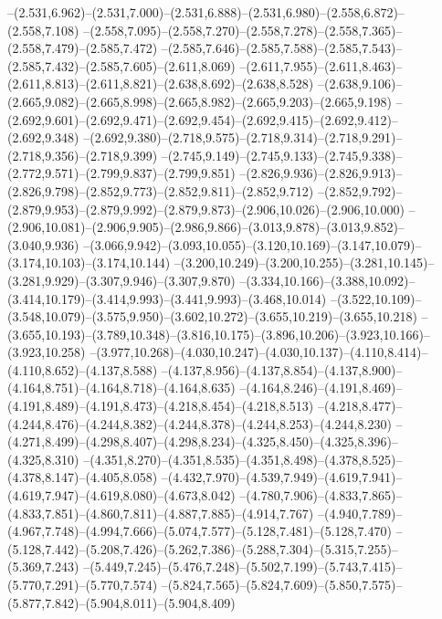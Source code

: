   --(2.531,6.962)--(2.531,7.000)--(2.531,6.888)--(2.531,6.980)--(2.558,6.872)--(2.558,7.108)%
  --(2.558,7.095)--(2.558,7.270)--(2.558,7.278)--(2.558,7.365)--(2.558,7.479)--(2.585,7.472)%
  --(2.585,7.646)--(2.585,7.588)--(2.585,7.543)--(2.585,7.432)--(2.585,7.605)--(2.611,8.069)%
  --(2.611,7.955)--(2.611,8.463)--(2.611,8.813)--(2.611,8.821)--(2.638,8.692)--(2.638,8.528)%
  --(2.638,9.106)--(2.665,9.082)--(2.665,8.998)--(2.665,8.982)--(2.665,9.203)--(2.665,9.198)%
  --(2.692,9.601)--(2.692,9.471)--(2.692,9.454)--(2.692,9.415)--(2.692,9.412)--(2.692,9.348)%
  --(2.692,9.380)--(2.718,9.575)--(2.718,9.314)--(2.718,9.291)--(2.718,9.356)--(2.718,9.399)%
  --(2.745,9.149)--(2.745,9.133)--(2.745,9.338)--(2.772,9.571)--(2.799,9.837)--(2.799,9.851)%
  --(2.826,9.936)--(2.826,9.913)--(2.826,9.798)--(2.852,9.773)--(2.852,9.811)--(2.852,9.712)%
  --(2.852,9.792)--(2.879,9.953)--(2.879,9.992)--(2.879,9.873)--(2.906,10.026)--(2.906,10.000)%
  --(2.906,10.081)--(2.906,9.905)--(2.986,9.866)--(3.013,9.878)--(3.013,9.852)--(3.040,9.936)%
  --(3.066,9.942)--(3.093,10.055)--(3.120,10.169)--(3.147,10.079)--(3.174,10.103)--(3.174,10.144)%
  --(3.200,10.249)--(3.200,10.255)--(3.281,10.145)--(3.281,9.929)--(3.307,9.946)--(3.307,9.870)%
  --(3.334,10.166)--(3.388,10.092)--(3.414,10.179)--(3.414,9.993)--(3.441,9.993)--(3.468,10.014)%
  --(3.522,10.109)--(3.548,10.079)--(3.575,9.950)--(3.602,10.272)--(3.655,10.219)--(3.655,10.218)%
  --(3.655,10.193)--(3.789,10.348)--(3.816,10.175)--(3.896,10.206)--(3.923,10.166)--(3.923,10.258)%
  --(3.977,10.268)--(4.030,10.247)--(4.030,10.137)--(4.110,8.414)--(4.110,8.652)--(4.137,8.588)%
  --(4.137,8.956)--(4.137,8.854)--(4.137,8.900)--(4.164,8.751)--(4.164,8.718)--(4.164,8.635)%
  --(4.164,8.246)--(4.191,8.469)--(4.191,8.489)--(4.191,8.473)--(4.218,8.454)--(4.218,8.513)%
  --(4.218,8.477)--(4.244,8.476)--(4.244,8.382)--(4.244,8.378)--(4.244,8.253)--(4.244,8.230)%
  --(4.271,8.499)--(4.298,8.407)--(4.298,8.234)--(4.325,8.450)--(4.325,8.396)--(4.325,8.310)%
  --(4.351,8.270)--(4.351,8.535)--(4.351,8.498)--(4.378,8.525)--(4.378,8.147)--(4.405,8.058)%
  --(4.432,7.970)--(4.539,7.949)--(4.619,7.941)--(4.619,7.947)--(4.619,8.080)--(4.673,8.042)%
  --(4.780,7.906)--(4.833,7.865)--(4.833,7.851)--(4.860,7.811)--(4.887,7.885)--(4.914,7.767)%
  --(4.940,7.789)--(4.967,7.748)--(4.994,7.666)--(5.074,7.577)--(5.128,7.481)--(5.128,7.470)%
  --(5.128,7.442)--(5.208,7.426)--(5.262,7.386)--(5.288,7.304)--(5.315,7.255)--(5.369,7.243)%
  --(5.449,7.245)--(5.476,7.248)--(5.502,7.199)--(5.743,7.415)--(5.770,7.291)--(5.770,7.574)%
  --(5.824,7.565)--(5.824,7.609)--(5.850,7.575)--(5.877,7.842)--(5.904,8.011)--(5.904,8.409)%
